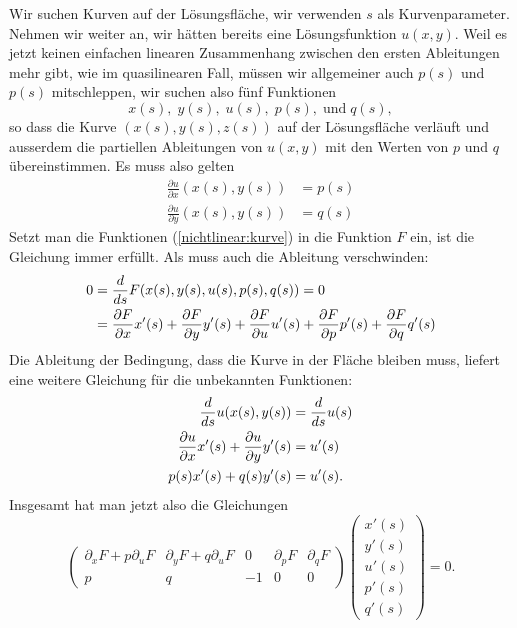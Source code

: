 Wir suchen Kurven auf der Lösungsfläche, wir verwenden $s$ als
Kurvenparameter.
Nehmen wir weiter an, wir hätten bereits eine Lösungsfunktion $u(x,y)$.
Weil es jetzt keinen
einfachen linearen Zusammenhang zwischen den ersten Ableitungen
mehr gibt, wie im quasilinearen Fall, müssen wir allgemeiner
auch $p(s)$ und $p(s)$ mitschleppen, wir suchen also fünf
Funktionen
\begin{equation}
x(s),\;
y(s),\; 
u(s),\; 
p(s),\; 
\text{und}\;
q(s),
\label{nichtlinear:kurve}
\end{equation}
so dass die Kurve $(x(s),y(s),z(s))$ auf der Lösungsfläche
verläuft und ausserdem die partiellen Ableitungen 
von $u(x,y)$ mit den Werten von $p$ und $q$ übereinstimmen.
Es muss also gelten
\begin{align*}
\frac{\partial u}{\partial x}(x(s), y(s))&=p(s)\\
\frac{\partial u}{\partial y}(x(s), y(s))&=q(s)
\end{align*}
Setzt man die Funktionen (\ref{nichtlinear:kurve}) in die Funktion
$F$ ein, ist die Gleichung immer erfüllt. Als muss auch die Ableitung
verschwinden:
\begin{align}
0
&=
\frac{d}{ds}F(x(s),y(s),u(s),p(s),q(s))=0
\notag
\\
&=
\frac{\partial F}{\partial x}x'(s)
+
\frac{\partial F}{\partial y}y'(s)
+
\frac{\partial F}{\partial u}u'(s)
+
\frac{\partial F}{\partial p}p'(s)
+
\frac{\partial F}{\partial q}q'(s)
\label{nichtlinear:totale}
\end{align}
Die Ableitung der Bedingung, dass die Kurve in der Fläche bleiben muss,
liefert eine weitere Gleichung für die unbekannten Funktionen:
\begin{align}
\frac{d}{ds}u(x(s),y(s))&=\frac{d}{ds}u(s)
\notag
\\
\frac{\partial u}{\partial x}x'(s)
+
\frac{\partial u}{\partial y}y'(s)
&=
u'(s)
\notag
\\
p(s)x'(s)+q(s)y'(s)
&=
u'(s).
\label{nichtlinear:flaeche}
\end{align}
Insgesamt hat man jetzt also die Gleichungen
\begin{equation}
\begin{pmatrix}
\partial_x F+p\partial_uF& \partial_y F+q\partial_uF&0&\partial_pF&\partial_qF\\
p&q&-1&0&0
\end{pmatrix}
\begin{pmatrix}
x'(s)\\
y'(s)\\
u'(s)\\
p'(s)\\
q'(s)
\end{pmatrix}=0.
\label{nichtlinear:gleichungen}
\end{equation}
